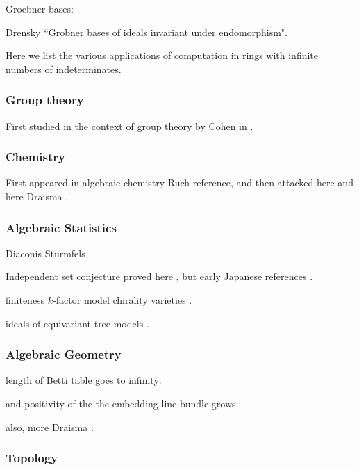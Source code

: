 

Groebner bases:

Drensky ``Grobner bases of ideals invariant under endomorphism".




Here we list the various applications of computation in rings with infinite numbers of indeterminates.  

\subsubsection{Group theory}

First studied in the context of group theory by Cohen in \cite{cohen1967laws}.

\subsubsection{Chemistry}

First appeared in algebraic chemistry \cite{} Ruch reference, and then attacked here \cite{aschenbrenner2007finite} and here Draisma \cite{Draisma08b}.

\subsubsection{Algebraic Statistics}

Diaconis Sturmfels \cite{diaconis1998algebraic}.

Independent set conjecture proved here \cite{hillar2012finite}, but early Japanese references \cite{}.

finiteness $k$-factor model chirality varieties \cite{Draisma08b}.

ideals of equivariant tree models \cite{draisma2009ideals}.

\subsubsection{Algebraic Geometry}

length of Betti table goes to infinity: \cite{ein2015asymptotics}

and positivity of the the embedding line bundle grows: \cite{ein2012asymptotic}

also, more Draisma \cite{draisma2015plucker}.

\subsubsection{Topology}

